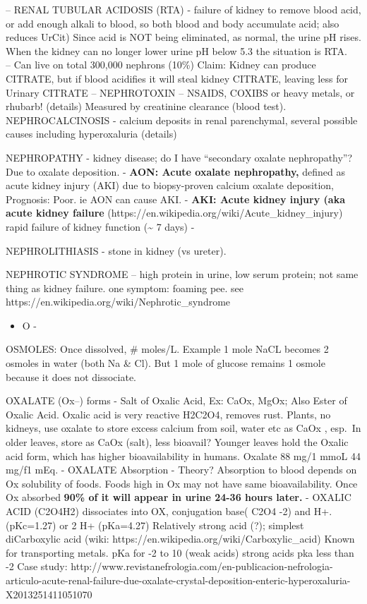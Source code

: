 -- RENAL TUBULAR ACIDOSIS (RTA) - failure of kidney to remove blood
acid, or add enough alkali to blood, so both blood and body accumulate
acid; also reduces UrCit) Since acid is NOT being eliminated, as normal,
the urine pH rises. When the kidney can no longer lower urine pH below
5.3 the situation is RTA.\\
-- Can live on total 300,000 nephrons (10\%) Claim: Kidney can produce
CITRATE, but if blood acidifies it will steal kidney CITRATE, leaving
less for Urinary CITRATE -- NEPHROTOXIN -- NSAIDS, COXIBS or heavy
metals, or rhubarb! (details) Measured by creatinine clearance (blood
test). NEPHROCALCINOSIS - calcium deposits in renal parenchymal, several
possible causes including hyperoxaluria (details)

NEPHROPATHY - kidney disease; do I have ``secondary oxalate
nephropathy''? Due to oxalate deposition. - \textbf{AON: Acute oxalate
nephropathy,} defined as acute kidney injury (AKI) due to biopsy-proven
calcium oxalate deposition, Prognosis: Poor. ie AON can cause AKI. -
\textbf{AKI: Acute kidney injury (aka acute kidney failure}
(https://en.wikipedia.org/wiki/Acute\_kidney\_injury) rapid failure of
kidney function (\textasciitilde{} 7 days) -

NEPHROLITHIASIS - stone in kidney (vs ureter).

NEPHROTIC SYNDROME -- high protein in urine, low serum protein; not same
thing as kidney failure. one symptom: foaming pee. see
https://en.wikipedia.org/wiki/Nephrotic\_syndrome

\begin{itemize}
\tightlist
\item
  O -
\end{itemize}

OSMOLES: Once dissolved, \# moles/L. Example 1 mole NaCL becomes 2
osmoles in water (both Na \& Cl). But 1 mole of glucose remains 1 osmole
because it does not dissociate.

OXALATE (Ox--) forms - Salt of Oxalic Acid, Ex: CaOx, MgOx; Also Ester
of Oxalic Acid. Oxalic acid is very reactive H2C2O4, removes rust.
Plants, no kidneys, use oxalate to store excess calcium from soil, water
etc as CaOx , esp.~In older leaves, store as CaOx (salt), less bioavail?
Younger leaves hold the Oxalic acid form, which has higher
bioavailability in humans. Oxalate 88 mg/1 mmoL 44 mg/f1 mEq. - OXALATE
Absorption - Theory? Absorption to blood depends on Ox solubility of
foods. Foods high in Ox may not have same bioavailability. Once Ox
absorbed \textbf{90\% of it will appear in urine 24-36 hours later.} -
OXALIC ACID (C2O4H2) dissociates into OX, conjugation base( C2O4 -2) and
H+. (pKc=1.27) or 2 H+ (pKa=4.27) Relatively strong acid (?); simplest
diCarboxylic acid (wiki: https://en.wikipedia.org/wiki/Carboxylic\_acid)
Known for transporting metals. pKa for -2 to 10 (weak acids) strong
acids pka less than -2 Case study:
http://www.revistanefrologia.com/en-publicacion-nefrologia-articulo-acute-renal-failure-due-oxalate-crystal-deposition-enteric-hyperoxaluria-X2013251411051070

